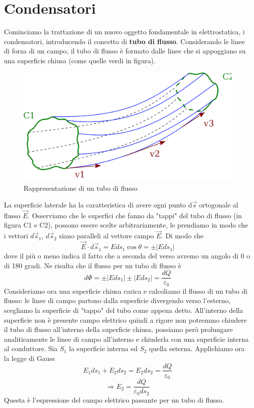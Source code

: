 \documentclass[10pt,a4paper]{article}
\begin{document}
\section{Condensatori}
Cominciamo la trattazione di un nuovo oggetto fondamentale in elettrostatica, i condensatori, introducendo il concetto di \textbf{tubo di flusso}. Considerando le linee di forza di un campo, il tubo di flusso è formato dalle linee che si appoggiano su una superficie chiusa (come quelle verdi in figura).
\begin{figure}[h!]
	\centering
	\includegraphics[width=0.6\linewidth]{images/tubo_di_flusso}
	\caption{Rappresentazione di un tubo di flusso}
	\label{fig:tubodiflusso}
\end{figure}
\FloatBarrier
La superficie laterale ha la caratteristica di avere ogni punto d$\vec{s}$ ortogonale al flusso $\vec{E}$. Osserviamo che le superfici che fanno da "tappi" del tubo di flusso (in figura C1 e C2), possono essere scelte arbitrariamente, le prendiamo in modo che i vettori $d\vec{s}_1$, \(d\vec{s}_2\) siano paralleli al vettore campo $\vec{E}$. Di modo che
\[\vec{E}\cdot d\vec{s}_1 = Eds_1\cos\theta= \pm |Eds_1|\]
dove il più o meno indica il fatto che a seconda del verso avremo un angolo di 0 o di 180 gradi. Ne risulta che il flusso per un tubo di flusso è
\[d\Phi = \pm |Eds_1|\pm |Eds_2| =\frac{dQ}{\varepsilon_0}\]
Consideriamo ora una superficie chiusa carica e calcoliamo il flusso di un tubo di flusso: le linee di campo partono dalla superficie divergendo verso l'esterno, scegliamo la superficie di "tappo" del tubo come appena detto. All'interno della superficie non è presente campo elettrico quindi a rigore non potremmo chiudere il tubo di flusso all'interno della superficie chiusa, possiamo però prolungare analiticamente le linee di campo all'interno e chiuderla con una superficie interna al conduttore. Sia \(S_1\) la superficie interna ed \(S_2\) quella esterna. Applichiamo ora la legge di Gauss
\[E_1ds_1+E_2ds_2 = E_2ds_2 = \frac{dQ}{\varepsilon_0}\]
\[\Rightarrow E_2 = \frac{dQ}{\varepsilon_0 ds_2}\]
Questa è l'espressione del campo elettrico passante per un tubo di flusso.\\
\end{document}
